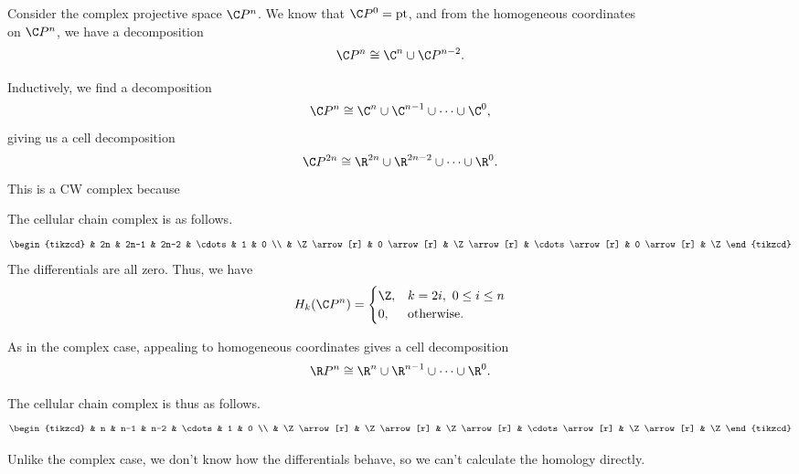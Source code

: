 \documentclass[main.tex]{subfiles}
\begin{document}
\begin{example}
  Consider the complex projective space $\C P^{n}$. We know that $\C P^{0} = \mathrm{pt}$, and from the homogeneous coordinates
  \begin{equation*}
    [x_{0} : \cdots | x_{n}]
  \end{equation*}
  on $\C P^{n}$, we have a decomposition
  \begin{equation*}
    \C P^{n} \cong \C^{n} \cup \C P^{n-2}.
  \end{equation*}

  Inductively, we find a decomposition
  \begin{equation*}
    \C P^{n} \cong \C^{n} \cup \C^{n-1} \cup \cdots \cup \C^{0},
  \end{equation*}
  giving us a cell decomposition
  \begin{equation*}
    \C P^{2n} \cong \R^{2n} \cup \R^{2n-2} \cup \cdots \cup \R^{0}.
  \end{equation*}
  This is a CW complex because

  The cellular chain complex is as follows.
  \begin{equation*}
    \begin{tikzcd}
      & 2n
      & 2n-1
      & 2n-2
      & \cdots
      & 1
      & 0
      \\
      & \Z
      \arrow[r]
      & 0
      \arrow[r]
      & \Z
      \arrow[r]
      & \cdots
      \arrow[r]
      & 0
      \arrow[r]
      & \Z
    \end{tikzcd}
  \end{equation*}
  The differentials are all zero. Thus, we have
  \begin{equation*}
    H_{k}(\C P^{n}) =
    \begin{cases}
      \Z, &k = 2i,\ 0 \leq i \leq n \\
      0, & \text{otherwise}.
    \end{cases}
  \end{equation*}
\end{example}

\begin{example}
  As in the complex case, appealing to homogeneous coordinates gives a cell decomposition
  \begin{equation*}
    \R P^{n} \cong \R^{n} \cup \R^{n-1} \cup \cdots \cup \R^{0}.
  \end{equation*}

  The cellular chain complex is thus as follows.
  \begin{equation*}
    \begin{tikzcd}
      & n
      & n-1
      & n-2
      & \cdots
      & 1
      & 0
      \\
      & \Z
      \arrow[r]
      & \Z
      \arrow[r]
      & \Z
      \arrow[r]
      & \cdots
      \arrow[r]
      & \Z
      \arrow[r]
      & \Z
    \end{tikzcd}
  \end{equation*}

  Unlike the complex case, we don't know how the differentials behave, so we can't calculate the homology directly.
\end{example}
\end{document}
